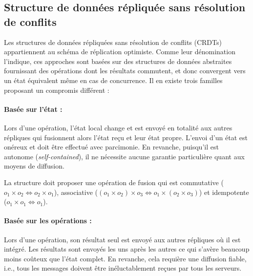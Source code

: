 \subsection{Structure de données répliquée sans résolution de conflits}
\label{repl:subsec:crdts}


Les structures de données répliquées sans résolution de conflits
(CRDTs)~\cite{shapiro2011comprehensive, shapiro2011conflict} appartiennent au
schéma de réplication optimiste. Comme leur dénomination l'indique, ces
approches sont basées sur des structures de données abstraites fournissant des
opérations dont les résultats commutent, et donc convergent vers un état
équivalent même en cas de concurrence.  Il en existe trois familles proposant un
compromis différent :

\paragraph{Basée sur l'état :} Lors d'une opération, l'état local change et est
envoyé en totalité aux autres répliques qui fusionnent alors l'état reçu et leur
état propre. L'envoi d'un état est onéreux et doit être effectué avec
parcimonie. En revanche, puisqu'il est autonome (\emph{self-contained}), il ne
nécessite aucune garantie particulière quant aux moyens de diffusion.

\noindent La structure doit proposer une opération de fusion qui est commutative
($o_1 \times o_2 \Leftrightarrow o_2 \times o_1$), associative
($(o_1 \times o_2) \times o_3 \Leftrightarrow o_1 \times (o_2 \times o_3)$) et
idempotente ($o_1 \times o_1 \Leftrightarrow o_1$).

\paragraph{Basée sur les opérations :} Lors d'une opération, son résultat seul
est envoyé aux autres répliques où il est intégré. Les résultats sont envoyés
les uns après les autres ce qui s'avère beaucoup moins coûteux que l'état
complet. En revanche, cela requière une diffusion fiable, i.e., tous les
messages doivent être inéluctablement reçues par tous les serveurs.

